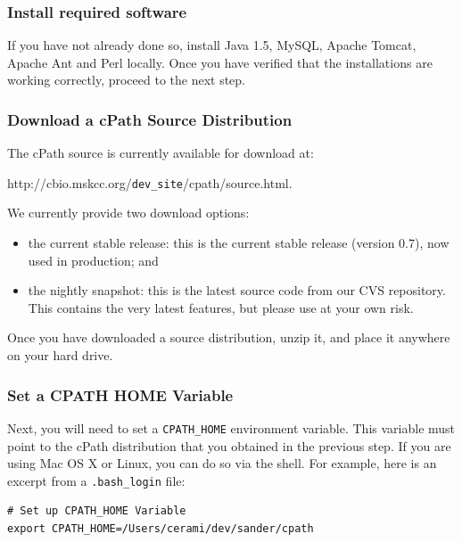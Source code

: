 \documentclass[letterpaper,12pt]{article}
\begin{document}
\subsubsection{Install required software}

If you have not already done so, install Java 1.5, MySQL, Apache Tomcat, Apache Ant and Perl locally. Once you have verified that the installations are working correctly, proceed to the next step. 

\subsubsection{Download a cPath Source Distribution}

The cPath source is currently available for download at: 

http://cbio.mskcc.org/\verb+dev_site+/cpath/source.html.

\bigskip

We currently provide two download options:

\begin{itemize}

\item the current stable release:  this is the current stable release (version 0.7), now used in production;  and

\item the nightly snapshot:  this is the latest source code from our CVS repository.  This contains the very latest features, but please use at your own risk.

\end{itemize}

Once you have downloaded a source distribution, unzip it, and place it anywhere on your hard drive.  

\subsubsection{Set a CPATH HOME Variable}

Next, you will need to set a \verb+CPATH_HOME+ environment variable. This variable must point to the cPath distribution that you obtained in the previous step.  If you are using Mac OS X or Linux, you can do so via the shell. For example, here is an excerpt from a \verb+.bash_login+ file:

\begin{verbatim}
# Set up CPATH_HOME Variable
export CPATH_HOME=/Users/cerami/dev/sander/cpath
\end{verbatim}
\end{document}
